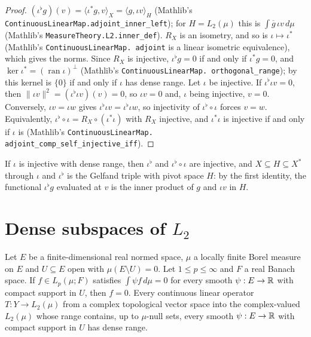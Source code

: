 \begin{proof}
\leanok
$(\iota^\flat g)(v) = \langle \iota^* g, v \rangle_X = \langle g, \iota v \rangle_H$ (Mathlib's
\texttt{ContinuousLinearMap.\allowbreak adjoint\_\allowbreak inner\_\allowbreak left}); for
$H = L_2(\mu)$ this is $\int \overline{g} \, \iota v \, d\mu$ (Mathlib's
\texttt{MeasureTheory.\allowbreak L2.\allowbreak inner\_\allowbreak def}). $R_X$ is an
isometry, and so is $\iota \mapsto \iota^*$ (Mathlib's \texttt{ContinuousLinearMap.\allowbreak
adjoint} is a linear isometric equivalence), which gives the norms. Since $R_X$ is injective,
$\iota^\flat g = 0$ if and only if $\iota^* g = 0$, and
$\ker \iota^* = (\operatorname{ran} \iota)^\perp$ (Mathlib's \texttt{ContinuousLinearMap.\allowbreak
orthogonal\_\allowbreak range}); by  this kernel is $\{0\}$ if
and only if $\iota$ has dense range. Let $\iota$ be injective. If $\iota^\flat \iota v = 0$, then
$\|\iota v\|^2 = (\iota^\flat \iota v)(v) = 0$, so $\iota v = 0$ and, $\iota$ being injective,
$v = 0$. Conversely, $\iota v = \iota w$ gives $\iota^\flat \iota v = \iota^\flat \iota w$, so
injectivity of $\iota^\flat \circ \iota$ forces $v = w$. Equivalently,
$\iota^\flat \circ \iota = R_X \circ (\iota^* \iota)$ with $R_X$ injective, and $\iota^* \iota$ is
injective if and only if $\iota$ is (Mathlib's \texttt{ContinuousLinearMap.\allowbreak
adjoint\_\allowbreak comp\_\allowbreak self\_\allowbreak injective\_\allowbreak iff}).
\end{proof}

If $\iota$ is injective with dense range, then $\iota^\flat$ and $\iota^\flat \circ \iota$ are
injective, and $X \subseteq H \subseteq X^*$ through $\iota$ and $\iota^\flat$ is the Gelfand triple
with pivot space $H$: by the first identity, the functional $\iota^\flat g$ evaluated at $v$ is the
inner product of $g$ and $\iota v$ in $H$.

\section{Dense subspaces of \texorpdfstring{$L_2$}{L\_2}}
\label{sec:l2-dense-smooth}

\begin{lemma}
\label{lem:l2-dense-smooth}
\leanok
{}
Let $E$ be a finite-dimensional real normed space, $\mu$ a locally finite Borel measure on $E$ and
$U \subseteq E$ open with $\mu(E \setminus U) = 0$. Let $1 \leq p \leq \infty$ and $F$ a real
Banach space. If $f \in L_p(\mu; F)$ satisfies $\int \psi f \, d\mu = 0$ for every smooth
$\psi : E \to \mathbb{R}$ with compact support in $U$, then $f = 0$. Every continuous linear operator
$T : Y \to L_2(\mu)$ from a complex topological vector space into the complex-valued
$L_2(\mu)$ whose range contains, up to $\mu$-null sets, every smooth $\psi : E \to \mathbb{R}$ with
compact support in $U$ has dense range.
\end{lemma}


